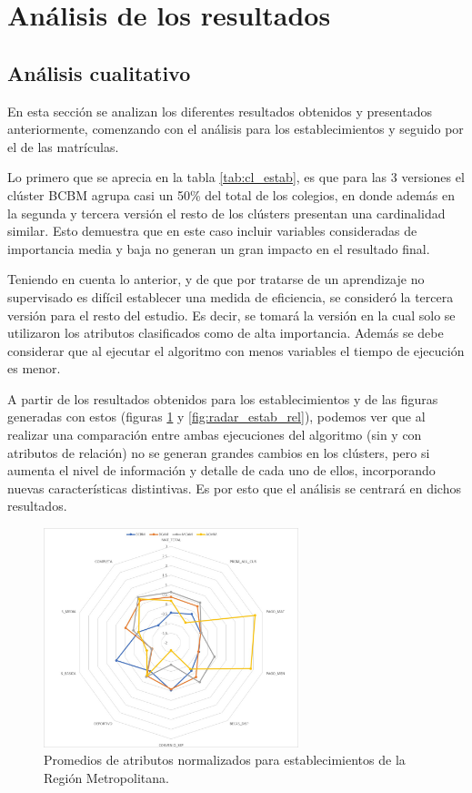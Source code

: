 \section{Análisis de los resultados}

\subsection{Análisis cualitativo}

En esta sección se analizan los diferentes resultados obtenidos y presentados anteriormente, comenzando con el análisis para los establecimientos y seguido por el de las matrículas.

Lo primero que se aprecia en la tabla \ref{tab:cl_estab}, es que para las 3 versiones el clúster BCBM agrupa casi un 50\% del total de los colegios, en donde además en la segunda y tercera versión el resto de los clústers presentan una cardinalidad similar. Esto demuestra que en este caso incluir variables consideradas de importancia media y baja no generan un gran impacto en el resultado final.

Teniendo en cuenta lo anterior, y de que por tratarse de un aprendizaje no supervisado es difícil establecer una medida de eficiencia, se consideró la tercera versión para el resto del estudio. Es decir, se tomará la versión en la cual solo se utilizaron los atributos clasificados como de alta importancia. Además se debe considerar que al ejecutar el algoritmo con menos variables el tiempo de ejecución es menor.

A partir de los resultados obtenidos para los establecimientos y de las figuras generadas con estos (figuras \ref{fig:radar_estab} y \ref{fig:radar_estab_rel}), podemos ver que al realizar una comparación entre ambas ejecuciones del algoritmo (sin y con atributos de relación) no se generan grandes cambios en los clústers, pero si aumenta el nivel de información y detalle de cada uno de ellos, incorporando nuevas características distintivas. Es por esto que el análisis se centrará en dichos resultados.

\begin{figure}[hc]
    \centering
    \includegraphics[width=0.66\textwidth]{images/radar_chart_establecimientos_sin.jpg}
    \caption{Promedios de atributos normalizados para establecimientos de la Región Metropolitana.}
    \label{fig:radar_estab}
\end{figure}

